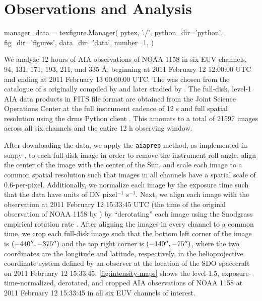 \section{Observations and Analysis}\label{sec:observations}
\begin{pycode}
manager_data = texfigure.Manager(
    pytex, './',
    python_dir='python',
    fig_dir='figures',
    data_dir='data',
    number=1,
)
\end{pycode}

We analyze 12 hours of AIA observations of \AR{} NOAA 1158 in six EUV channels, 94, 131, 171, 193, 211, and 335 \AA{}, beginning at 2011 February 12 12:00:00 UTC and ending at 2011 February 13 00:00:00 UTC.
The \AR{} was chosen from the catalogue of \AR s originally compiled by \citet{warren_systematic_2012} and later studied by .
The full-disk, level-1 AIA data products in FITS file format are obtained from the Joint Science Operations Center \citep[JSOC,][]{couvidat_observables_2016} at the full instrument cadence of 12 s and full spatial resolution using the drms Python client \citep{glogowski_drms_2019}.
This amounts to a total of 21597 images across all six channels and the entire 12 h observing window.

After downloading the data, we apply the \texttt{aiaprep} method, as implemented in sunpy \citep{the_sunpy_community_sunpy_2020}, to each full-disk image in order to remove the instrument roll angle, align the center of the image with the center of the Sun, and scale each image to a common spatial resolution such that images in all channels have a spatial scale of 0.6\arcsec-per-pixel.
Additionally, we normalize each image by the exposure time such that the data have units of DN pixel$^{-1}$ s$^{-1}$.
Next, we align each image with the observation at 2011 February 12 15:33:45 UTC (the time of the original observation of NOAA 1158 by \citet{warren_systematic_2012}) by ``derotating'' each image using the Snodgrass empirical rotation rate \citep{snodgrass_magnetic_1983}.
After aligning the images in every channel to a common time, we crop each full-disk image such that the bottom left corner of the image is $(-440\mbox{$^{\prime\prime}$},-375\mbox{$^{\prime\prime}$})$ and the top right corner is $(-140\mbox{$^{\prime\prime}$},-75\mbox{$^{\prime\prime}$})$, where the two coordinates are the longitude and latitude, respectively, in the helioprojective coordinate system \citep[see][]{thompson_coordinate_2006} defined by an observer at the location of the SDO spacecraft on 2011 February 12 15:33:45.
\autoref{fig:intensity-maps} shows the level-1.5, exposure-time-normalized, derotated, and cropped AIA observations of \AR{} NOAA 1158 at 2011 February 12 15:33:45 in all six EUV channels of interest.

